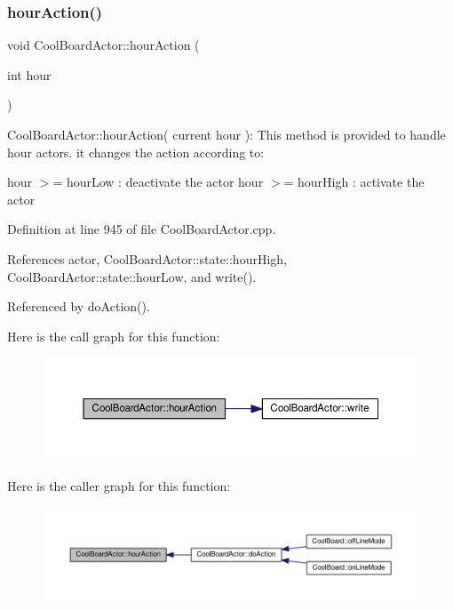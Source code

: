 \subsubsection{\texorpdfstring{hour\+Action()}{hourAction()}}
{\footnotesize\ttfamily void Cool\+Board\+Actor\+::hour\+Action (\begin{DoxyParamCaption}\item[{int}]{hour }\end{DoxyParamCaption})}

Cool\+Board\+Actor\+::hour\+Action( current hour )\+: This method is provided to handle hour actors. it changes the action according to\+:

hour $>$= hour\+Low \+: deactivate the actor hour $>$= hour\+High \+: activate the actor 

Definition at line 945 of file Cool\+Board\+Actor.\+cpp.



References actor, Cool\+Board\+Actor\+::state\+::hour\+High, Cool\+Board\+Actor\+::state\+::hour\+Low, and write().



Referenced by do\+Action().

Here is the call graph for this function\+:\nopagebreak
\begin{figure}[H]
\begin{center}
\leavevmode
\includegraphics[width=350pt]{dc/d69/class_cool_board_actor_adf3b4e15b9d73681082112adf8ef95cb_cgraph}
\end{center}
\end{figure}
Here is the caller graph for this function\+:\nopagebreak
\begin{figure}[H]
\begin{center}
\leavevmode
\includegraphics[width=350pt]{dc/d69/class_cool_board_actor_adf3b4e15b9d73681082112adf8ef95cb_icgraph}
\end{center}
\end{figure}
\mbox{\label{class_cool_board_actor_a6d93a24502c56ced2ef7675c913a276b}} 
